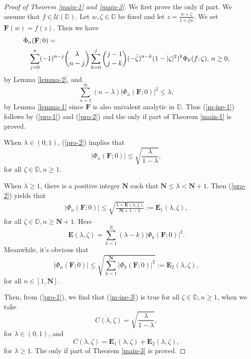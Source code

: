 \documentclass[10pt,a4paper]{amsart}
\begin{document}
\begin{proof}[Proof of Theorem \ref{main-1} and \ref{main-3}]
We first prove the only if part. We assume that $f\in \mathcal{U}(\mathbb{D})$.  Let $w, \zeta\in \mathbb{D}$ be fixed and let $z=\frac{w+\zeta}{1+\bar{\zeta}w}$.  We set $\mathbf{F}(w)=f(z)$.  Then we have 
\begin{eqnarray}\label{pro-1}
\lefteqn{\Phi_{n}(\mathbf{F}; 0)=} \\
&&\sum_{j=0}^{n}(-1)^{n-j}\binom{\lambda}{n-j}\sum_{k=0}^{j}\binom{j-1}{j-k}(-\bar{\zeta})^{n-k}(1-|\zeta|^2)^{k}\Phi_{k}(f; \zeta),\, n \geq 0, \nonumber
\end{eqnarray}
by Lemma \ref{lemma-2}, and \begin{equation}\label{pro-2}
 \sum_{n=1}^{\infty}(n-\lambda)|\Phi_n(\mathbf{F}; 0)|^2\leq \lambda,
 \end{equation}
 by  Lemma \ref{lemma-1} since $\mathbf{F}$ is also univalent analytic in $\mathbb{D}$. Thus (\ref{m-ine-1}) follows by (\ref{pro-1}) and (\ref{pro-2}) and the only if part of Theorem \ref{main-1} is proved.
 
 When $\lambda\in (0,1)$, (\ref{pro-2}) implies that  
\begin{equation}|\Phi_n(\mathbf{F}; 0)|\leq  \sqrt{\frac{\lambda}{1-\lambda}},  \nonumber
\end{equation}for all $\zeta\in \mathbb{D}, n\geq 1.$

When $\lambda\geq1$,  there is a positive integer $\mathbf{N}$ such that $\mathbf{N}\leq \lambda < \mathbf{N}+1$. Then (\ref{pro-2}) yields  that  
\begin{eqnarray}
|\Phi_n(\mathbf{F}; 0)| \leq\sqrt{\frac{\lambda+ \mathbf{E}(\lambda, \zeta)}{\mathbf{N}+1-\lambda}}:=\mathbf{E}_1(\lambda, \zeta), \nonumber
\end{eqnarray}
for all $\zeta\in \mathbb{D}, n\geq \mathbf{N}+1$.  Here $$ \mathbf{E}(\lambda, \zeta)=\sum_{k=1}^{N}(\lambda-k)|\Phi_k(\mathbf{F}; 0)|^2.$$
Meanwhile, it's obvious that 
$$|\Phi_n(\mathbf{F}; 0)|  \leq \sqrt{\sum_{k=1}^{\mathbf{N}}|\Phi_k(\mathbf{F}; 0)|^2}:=\mathbf{E}_2(\lambda, \zeta),$$ for all $n \in [1, \mathbf{N}].$ 

Then, from (\ref{pro-1}), we find that (\ref{m-ine-3}) is true for all $\zeta\in \mathbb{D}, n\geq 1$,  when we take 
$$C(\lambda, \zeta)=\sqrt{\frac{\lambda}{1-\lambda}},$$ for $\lambda\in (0,1)$, 
and  
$$C(\lambda, \zeta)=\mathbf{E}_1(\lambda, \zeta)+\mathbf{E}_2(\lambda, \zeta),$$
for $\lambda\geq 1$.  The only if part of Theorem \ref{main-3} is proved.


\end{proof}
\end{document}
